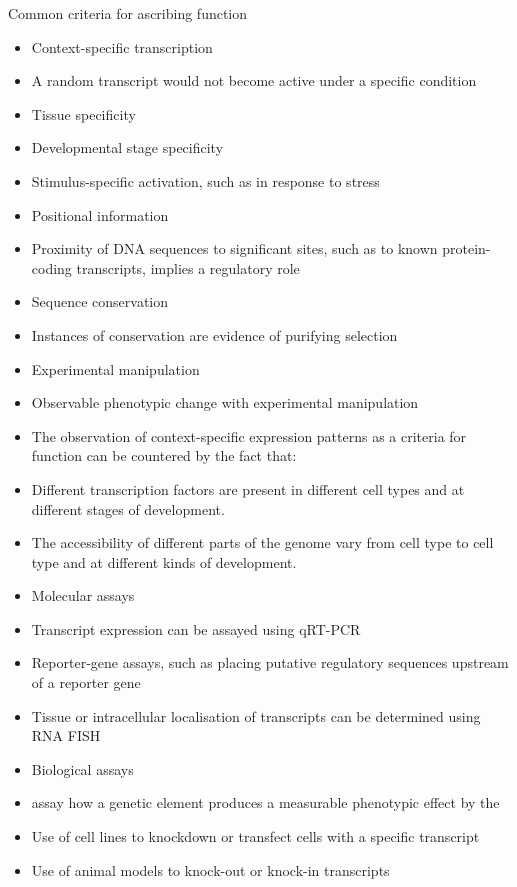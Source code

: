 Common criteria for ascribing function

\begin{itemize}
   \item Context-specific transcription
   \item A random transcript would not become active under a specific condition
   \item Tissue specificity
   \item Developmental stage specificity
   \item Stimulus-specific activation, such as in response to stress
   \item Positional information
   \item Proximity of DNA sequences to significant sites, such as to known protein-coding transcripts, implies a regulatory role
   \item Sequence conservation
   \item Instances of conservation are evidence of purifying selection
   \item Experimental manipulation
   \item Observable phenotypic change with experimental manipulation
   \item The observation of context-specific expression patterns as a criteria for function can be countered by the fact that:
   \item Different transcription factors are present in different cell types and at different stages of development.
   \item The accessibility of different parts of the genome vary from cell type to cell type and at different kinds of development.
   \item Molecular assays
   \item Transcript expression can be assayed using qRT-PCR
   \item Reporter-gene assays, such as placing putative regulatory sequences upstream of a reporter gene
   \item Tissue or intracellular localisation of transcripts can be determined using RNA FISH
   \item Biological assays
   \item assay how a genetic element produces a measurable phenotypic effect by the
   \item Use of cell lines to knockdown or transfect cells with a specific transcript
   \item Use of animal models to knock-out or knock-in transcripts
\end{itemize}

